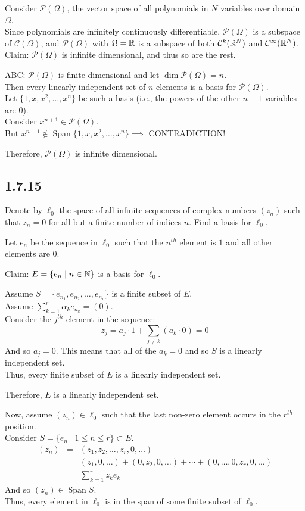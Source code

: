 \documentclass[letterpaper,12pt,fleqn]{article}
\newcommand{\mc}{\mathcal{C}}
\renewcommand{\mp}{\mathcal{P}}
\renewcommand{\a}{\alpha}
\renewcommand{\O}{\Omega}
\DeclareMathOperator{\spn}{Span}
\begin{document}
Consider $\mp(\O)$, the vector space of all polynomials in $N$ variables over
domain $\O$. \\
Since polynomials are infinitely continuously differentiable, $\mp(\O)$ is a
subspace of $\mc(\O)$, and $\mp(\O)$ with $\O=\R$ is a subspace of both
$\mc^k(\R^N)$ and $\mc^{\infty}(\R^N)$. \\
Claim: $\mp(\O)$ is infinite dimensional, and thus so are the rest.

ABC: $\mp(\O)$ is finite dimensional and let $\dim\mp(\O)=n$. \\
Then every linearly independent set of $n$ elements is a basis for $\mp(\O)$. \\
Let $\{1,x,x^2,\ldots,x^n\}$ be such a basis (i.e., the powers of the other
$n-1$ variables are $0$). \\
Consider $x^{n+1}\in\mp(\O)$. \\
But $x^{n+1}\notin\spn\{1,x,x^2,\ldots,x^n\}\implies$ CONTRADICTION!

Therefore, $\mp(\O)$ is infinite dimensional.

\subsection*{1.7.15}

Denote by $\ell_0$ the space of all infinite sequences of complex numbers
$(z_n)$ such that $z_n=0$ for all but a finite number of indices $n$. Find a
basis for $\ell_0$.

Let $e_n$ be the sequence in $\ell_0$ such that the $n^{th}$ element is $1$ and
all other elements are $0$.

Claim: $E=\{e_n\mid n\in\mathbb{N}\}$ is a basis for $\ell_0$.

Assume $S=\{e_{n_1},e_{n_2},\ldots,e_{n_r}\}$ is a finite subset of $E$. \\
Assume $\sum_{k=1}^r\a_ke_{n_k}=(0)$. \\
Consider the $j^{th}$ element in the sequence:
\[z_j=a_j\cdot1+\sum_{j\ne k}(a_k\cdot0)=0\]
And so $a_j=0$.
This means that all of the $a_k=0$ and so $S$ is a linearly independent set. \\
Thus, every finite subset of $E$ is a linearly independent set.

Therefore, $E$ is a linearly independent set.

Now, assume $(z_n)\in\ell_0$ such that the last non-zero element occurs in the
$r^{th}$ position. \\
Consider $S=\{e_n\mid1\le n\le r\}\subset E$.
\begin{eqnarray*}
  (z_n) &=& (z_1,z_2,\ldots,z_r,0,\ldots) \\
  &=& (z_1,0,\ldots)+(0,z_2,0,\ldots)+\cdots+(0,\ldots,0,z_r,0,\ldots) \\
  &=& \sum_{k=1}^rz_ke_k
\end{eqnarray*}
And so $(z_n)\in\spn S$. \\
Thus, every element in $\ell_0$ is in the span of some finite subset of
$\ell_0$.
\end{document}
